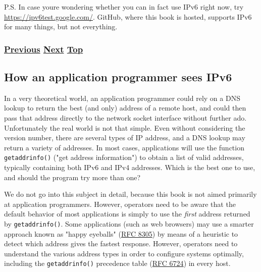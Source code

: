 \documentclass[
]{article}
\begin{document}
P.S. In case you\textquotesingle re wondering whether you can in fact
use IPv6 right now, try \url{https://ipv6test.google.com/}. GitHub,
where this book is hosted, supports IPv6 for many things, but not
everything.

\subsubsection{\texorpdfstring{\hyperref[how-to-use-this-book]{Previous}
\hyperref[how-an-application-programmer-sees-ipv6]{Next}
\hyperref[introduction-and-foreword]{Top}}{Previous Next Top}}\label{previous-next-top-1}

\pagebreak

\subsection{How an application programmer sees
IPv6}\label{how-an-application-programmer-sees-ipv6}

In a very theoretical world, an application programmer could rely on a
DNS lookup to return the best (and only) address of a remote host, and
could then pass that address directly to the network socket interface
without further ado. Unfortunately the real world is not that simple.
Even without considering the version number, there are several types of
IP address, and a DNS lookup may return a variety of addresses. In most
cases, applications will use the function \texttt{getaddrinfo()} ("get
address information") to obtain a list of valid addresses, typically
containing both IPv6 and IPv4 addresses. Which is the best one to use,
and should the program try more than one?

We do not go into this subject in detail, because this book is not aimed
primarily at application programmers. However, operators need to be
aware that the default behavior of most applications is simply to use
the \emph{first} address returned by \texttt{getaddrinfo()}. Some
applications (such as web browsers) may use a smarter approach known as
"happy eyeballs" (\href{https://www.rfc-editor.org/info/rfc8305}{RFC
8305}) by means of a heuristic to detect which address gives the fastest
response. However, operators need to understand the various address
types in order to configure systems optimally, including the
\texttt{getaddrinfo()} precedence table
(\href{https://www.rfc-editor.org/info/rfc6724}{RFC 6724}) in every
host.
\end{document}
